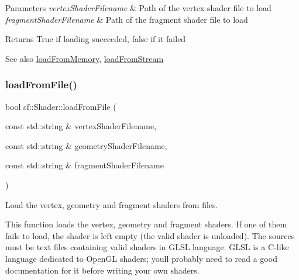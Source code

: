 \begin{DoxyParams}{Parameters}
{\em vertex\+Shader\+Filename} & Path of the vertex shader file to load \\
\hline
{\em fragment\+Shader\+Filename} & Path of the fragment shader file to load\\
\hline
\end{DoxyParams}
\begin{DoxyReturn}{Returns}
True if loading succeeded, false if it failed
\end{DoxyReturn}
\begin{DoxySeeAlso}{See also}
\hyperlink{classsf_1_1_shader_ac92d46bf71dff2d791117e4e472148aa}{load\+From\+Memory}, \hyperlink{classsf_1_1_shader_a2ee1b130c0606e4f8bcdf65c1efc2a53}{load\+From\+Stream} 
\end{DoxySeeAlso}
\mbox{\label{classsf_1_1_shader_a295d8468811ca15bf9c5401a7a7d4f54}} 
\subsubsection{\texorpdfstring{load\+From\+File()}{loadFromFile()}\hspace{0.1cm}{\footnotesize\ttfamily [3/3]}}
{\footnotesize\ttfamily bool sf\+::\+Shader\+::load\+From\+File (\begin{DoxyParamCaption}\item[{const std\+::string \&}]{vertex\+Shader\+Filename,  }\item[{const std\+::string \&}]{geometry\+Shader\+Filename,  }\item[{const std\+::string \&}]{fragment\+Shader\+Filename }\end{DoxyParamCaption})}



Load the vertex, geometry and fragment shaders from files. 

This function loads the vertex, geometry and fragment shaders. If one of them fails to load, the shader is left empty (the valid shader is unloaded). The sources must be text files containing valid shaders in G\+L\+SL language. G\+L\+SL is a C-\/like language dedicated to Open\+GL shaders; you\textquotesingle{}ll probably need to read a good documentation for it before writing your own shaders.


